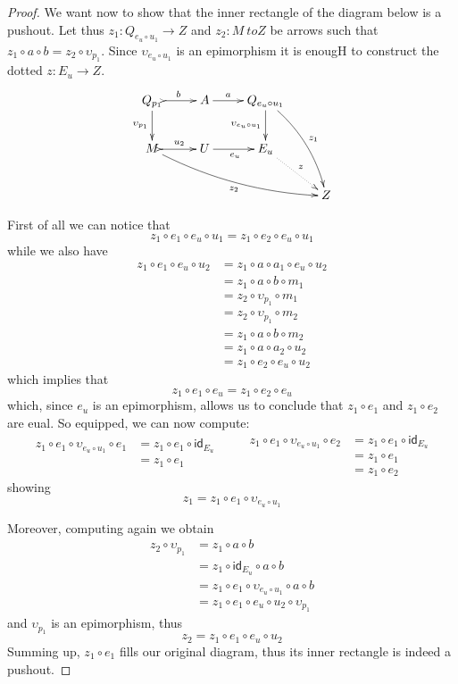 \documentclass[a4paper]{article}
\newcommand{\id}[1]{\mathsf{id}_{#1}}
\theoremstyle{definition}
\begin{document}
\begin{proof}
	We want now to show that the inner rectangle of the diagram below is a pushout.  Let thus $z_1\colon Q_{e_u\circ u_1}\to Z$ and $z_2\colon M\ to Z$ be arrows such that $z_1\circ a\circ b=z_2\circ \upsilon_{p_1}$. Since $\upsilon_{e_u\circ u_1}$ is an epimorphism it is enougH to construct the dotted $z\colon E_u \to Z$. 
	\[\xymatrix{Q_{p_1} \ar@{>->}[r]^{b} \ar[d]_{\upsilon_{p_1}}& A \ar[r]^-{a}& Q_{e_u\circ u_1} \ar[d]_{\upsilon_{e_u\circ u_1}} \ar@/^.3cm/[ddr]^{z_1} \\M \ar@/_.3cm/[drrr]_{z_2}\ar@{>->}[r]^-{u_2}&U \ar[r]_{e_u}& E_u \ar@{.>}[dr]^{z}\\ & & & Z}\]
	
	First of all we can notice that
	\[z_1\circ e_1\circ e_u\circ u_1 = z_1\circ e_2\circ e_u\circ u_1\]
	while we also have
	\begin{align*}
		z_1\circ e_1\circ e_u\circ u_2 &= z_1\circ a\circ a_1\circ e_u\circ u_2\\&=z_1\circ a \circ b\circ m_1\\&=z_2\circ \upsilon_{p_1} \circ m_1
		\\&=z_2\circ \upsilon_{p_1} \circ m_2
		\\&=z_1\circ a \circ b\circ m_2 
		\\&=z_1\circ a\circ a_2\circ u_2
		\\&=z_1\circ e_2\circ e_u \circ u_2
	\end{align*}
	which implies that
	\[z_1\circ e_1\circ e_u  = z_1\circ e_2\circ e_u\]
	which, since $e_u$ is an epimorphism, allows us to conclude that $z_1\circ e_1$ and $z_1\circ e_2$ are eual. So equipped, we can now compute:
	\[\begin{split}
		z_1\circ e_1\circ \upsilon_{e_u\circ u_1}\circ e_1&=z_1\circ e_1\circ \id{E_u}\\&=z_1\circ e_1\\&
	\end{split} \qquad \begin{split}
		z_1\circ e_1\circ \upsilon_{e_u\circ u_1}\circ e_2&=z_1\circ e_1\circ \id{E_u}\\&=z_1\circ e_1\\&=z_1\circ e_2
	\end{split}\]
	showing 
	\[z_1=z_1\circ e_1 \circ  \upsilon_{e_u\circ u_1}\]
	
	Moreover, computing again we obtain
	\begin{align*}
		z_2\circ \upsilon_{p_1}&=z_1\circ a \circ b \\&=z_1\circ \id{E_u} \circ a \circ b\\&=z_1\circ e_1 \circ \upsilon_{e_u\circ u_1} \circ a\circ b\\&=z_1\circ e_1\circ e_u\circ u_2 \circ \upsilon_{p_1} 
	\end{align*}
	and $\upsilon_{p_1}$ is an epimorphism, thus
	\[z_2=z_1\circ e_1\circ e_u \circ u_2\]
	Summing up, $z_1\circ e_1$ fills our original diagram, thus its inner rectangle is indeed a pushout.
	

\end{proof}
\end{document}
